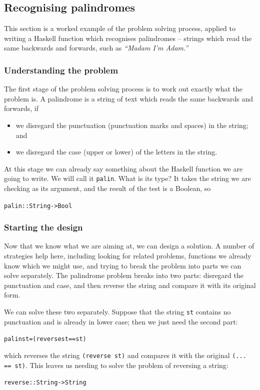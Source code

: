 \subsection*{Recognising palindromes}
\label{Palindromes}

This section is a worked example of the problem solving process, applied to writing a Haskell function which recognises palindromes -- strings which read the same backwards and forwards, such as \emph{``Madam I'm Adam.''}

\subsubsection*{Understanding the problem}

The first stage of the problem solving process is to work out exactly what the problem is. A palindrome is a string of text which reads the same backwards and forwards, if
\begin{itemize}
\item
we disregard the punctuation (punctuation marks and spaces) in the string; and
\item
we disregard the case (upper or lower) of the letters in the string.
\end{itemize}

At this stage we can already say something about the Haskell function we are going to write. We will call it \texttt{palin}. What is its type? It takes the string we are checking as its argument, and the result of the test is a Boolean, so
\begin{alltt}
palin :: String -> Bool
\end{alltt}

\subsubsection*{Starting the design}

Now that we know what we are aiming at, we can design a solution. A number of strategies help here, including looking for related problems, functions we already know which we might use, and trying to break the problem into parts we can solve separately. The palindrome problem breaks into two parts: disregard the punctuation and case, and then reverse the string and compare it with its original form.

We can solve these two separately. Suppose that the string \texttt{st} contains no punctuation and is already in lower case; then we just need the second part:
\begin{alltt}
palin st = (reverse st == st)
\end{alltt}
which reverses the string \texttt{(reverse st)} and compares it with the original \texttt{(... == st)}. This leaves us needing to solve the problem of reversing a string:
\begin{alltt}
reverse :: String -> String
\end{alltt}

